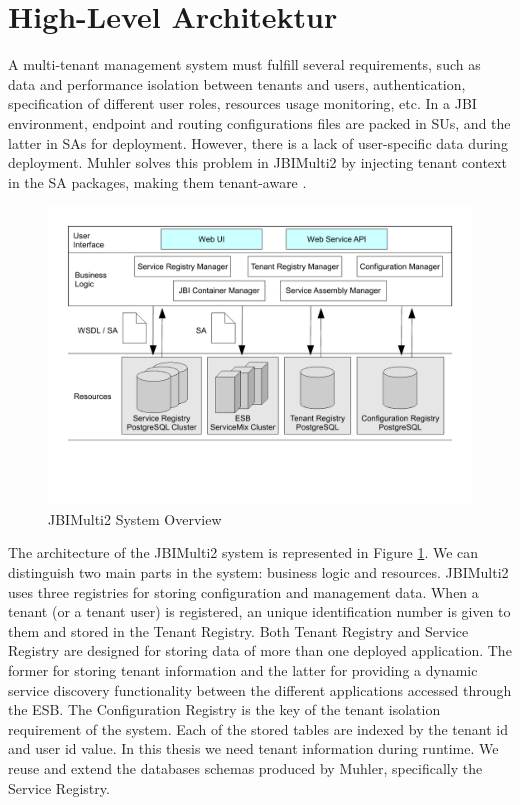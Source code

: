 \section{High-Level Architektur}
\label{sec:HighLevelArchitektur}  

A multi-tenant management system must fulfill several requirements, such as data and performance isolation between tenants and users, authentication, specification of different user roles, resources usage monitoring, etc. In a \ac{JBI} environment, endpoint and routing configurations files are packed in \ac{SU}s, and the latter in \ac{SA}s for deployment. However, there is a lack of user-specific data during deployment. Muhler solves this problem in JBIMulti2 by injecting tenant context in the \ac{SA} packages, making them tenant-aware \cite{Muhler2012}. 

\begin{figure}[htb]
	\centering
		\includegraphics[clip, scale=0.5]{./gfx/systemoverview_jbimulti2.pdf}
	\caption[JBIMulti2 System Overview]{JBIMulti2 System Overview \cite{Muhler2012}} 
	\label{fig:jbimulti2}
\end{figure}

The architecture of the JBIMulti2 system is represented in Figure \ref{fig:jbimulti2}. We can distinguish two main parts in the system: business logic and resources. JBIMulti2 uses three registries for storing configuration and management data. When a tenant (or a tenant user) is registered, an unique identification number is given to them and stored in the Tenant Registry. Both Tenant Registry and Service Registry are designed for storing data of more than one deployed application. The former for storing tenant information and the latter for providing a dynamic service discovery functionality between the different applications accessed through the \ac{ESB}. The Configuration Registry is the key of the tenant isolation requirement of the system. Each of the stored tables are indexed by the tenant id  and user id value. In this thesis we need tenant information during runtime. We reuse and extend the databases schemas produced by Muhler, specifically the Service Registry.


